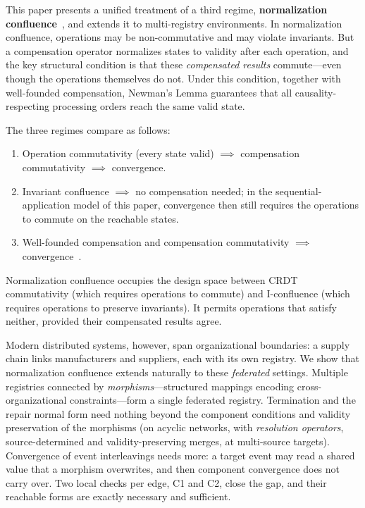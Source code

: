 \documentclass[11pt,a4paper]{article}
\theoremstyle{plain}
\theoremstyle{definition}
\theoremstyle{remark}
\renewcommand{\_}{\textunderscore\allowbreak}
\begin{document}
This paper presents a unified treatment of a third regime, \textbf{normalization
confluence}~\cite{blackwell2026nc}, and extends it to multi-registry
environments.  In normalization confluence, operations may be non-commutative
and may violate invariants.  But a
compensation operator normalizes states to validity after each operation, and
the key structural condition is that these \emph{compensated results}
commute---even though the operations themselves do not.  Under this condition,
together with well-founded compensation, Newman's Lemma guarantees that all
causality-respecting processing orders reach the same valid state.

The three regimes compare as follows:
\begin{enumerate}[leftmargin=*,nosep]
\item Operation commutativity (every state valid) $\implies$ compensation
  commutativity $\implies$ convergence.
\item Invariant confluence $\implies$ no compensation needed; in the
  sequential-application model of this paper, convergence then still
  requires the operations to commute on the reachable states.
\item Well-founded compensation and compensation commutativity $\implies$
  convergence~\cite{blackwell2026nc}.
\end{enumerate}
Normalization confluence occupies the design space between CRDT commutativity
(which requires operations to commute) and I-confluence (which requires
operations to preserve invariants).  It permits operations that satisfy
neither, provided their compensated results agree.

Modern distributed systems, however, span organizational boundaries: a supply
chain links manufacturers and suppliers, each with its own registry.  We show
that normalization confluence extends naturally to these \emph{federated}
settings.  Multiple registries connected by \emph{morphisms}---structured
mappings encoding cross-organizational constraints---form a single federated
registry.  Termination and the repair normal form need nothing beyond the
component conditions and validity preservation of the morphisms (on acyclic
networks, with \emph{resolution operators}, source-determined and
validity-preserving merges, at multi-source targets).  Convergence of event
interleavings needs more: a target event may read a shared value that a
morphism overwrites, and then component convergence does not carry over.  Two
local checks per edge, C1 and C2, close the gap, and their reachable forms are
exactly necessary and sufficient.
\end{document}
